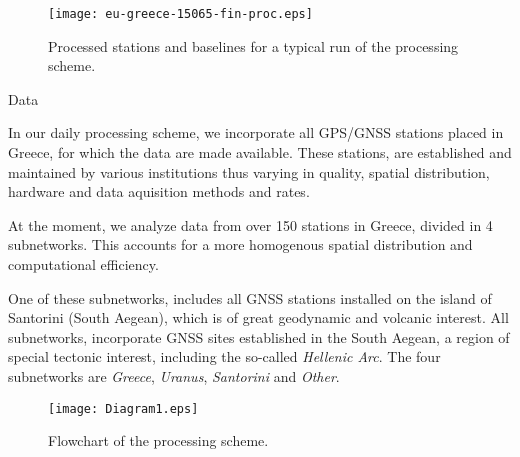 \documentclass[final,a0,portrait]{beamer}
\newlength{\onecolwid}
\begin{document}
\begin{frame}[t]
\begin{columns}[t]
\begin{column}{\onecolwid}
\begin{figure}
    \texttt{[image: eu-greece-15065-fin-proc.eps]}
    \caption{Processed stations and baselines for a typical run of the processing scheme.}
    \label{fig:proc-net}
\end{figure}

\begin{block}{Data}
{\small
In our daily processing scheme, we incorporate all GPS/GNSS stations placed in Greece, for which the data are made available. 
These stations, are established and maintained by various institutions thus varying in quality, spatial distribution, hardware and 
data aquisition methods and rates.

At the moment, we analyze data from over 150 stations in Greece, divided in 4 subnetworks. 
This accounts for a more homogenous spatial distribution and computational efficiency.


One of these subnetworks, includes all GNSS stations installed on the island of Santorini (South Aegean), which is of great
geodynamic and volcanic interest. All subnetworks, incorporate GNSS sites established in the South Aegean, a region of special 
tectonic interest, including the so-called \emph{Hellenic Arc}. The four subnetworks are \emph{Greece}, \emph{Uranus}, \emph{Santorini} 
and \emph{Other}.
}
\begin{figure}
  \centering
  \texttt{[image: Diagram1.eps]}
  \caption{Flowchart of the processing scheme.}
  \label{fig:test2}
\end{figure}
\end{block}


\end{column}
\end{columns}
\end{frame}
\end{document}
